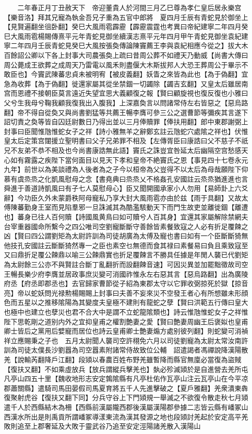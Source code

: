 　　二年春正月丁丑赦天下　帝迎董貴人於河間三月乙巳尊為孝仁皇后居永樂宫【樂音洛】拜其兄寵為執金吾兄子重為五官中郎將　夏四月壬辰有青蛇見於御坐上【見賢遍翻坐徂卧翻】癸巳大風雨雹霹靂【霹靂震霆也考異曰帝紀建寧二年四月癸巳大風雨雹楊賜傳熹平元年青蛇見御坐續漢志熹平元年四月甲午青蛇見御坐袁紀建寧二年四月壬辰青蛇見癸巳大風按張奐傳論陳竇薦王李與袁紀相應今從之】拔大木百餘詔公卿以下各上封事大司農張奐上疏曰昔周公葬不如禮天乃動威【尚書大傳曰周公薨成王欲葬之成周天乃雷電以風禾則盡偃大木斯拔邦人大恐王葬周公于畢示不敢臣也】今竇武陳蕃忠貞未被明宥【被皮義翻】妖眚之來皆為此也【為于偽翻】宜急為收葬【為于偽翻】徙還家屬其從坐禁錮一切蠲除【蠲吉玄翻】又皇太后雖居南宫而恩禮不接朝臣莫言遠近失望宜思大義顧復之報【賢曰顧旋視也復反復也小雅曰父兮生我母兮鞠我顧我復我出入腹我】上深嘉奐言以問諸常侍左右皆惡之【惡烏路翻】帝不得自從奐又與尚書劉猛等共薦王暢李膺可參三公之選曹節等彌疾其言遂下詔切責之奐等皆自囚廷尉數日乃得出並以三月俸贖罪【俸扶用翻】郎中東郡謝弼上封事曰臣聞惟虺惟蛇女子之祥【詩小雅無羊之辭鄭玄註云虺蛇穴處隂之祥也】伏惟皇太后定策宫闥援立聖明書曰父子兄弟罪不相及【左傳胥臣曰康誥曰父不慈子不祇兄不友弟不恭不相及也今尚書康誥無此語】竇氏之誅豈宜咎延太后幽隔空宫愁感天心如有霧露之疾陛下當何面目以見天下孝和皇帝不絶竇氏之恩【事見四十七卷永元九年】前世以為美談禮為人後者為之子今以桓帝為父豈得不以太后為母哉願陛下仰慕有虞烝烝之化凱風慰母之念【書堯典曰烝烝乂不格姦孔安國註云烝烝猶進進也言舜進于善道詩凱風曰有子七人莫慰母心】臣又聞開國承家小人勿用【易師卦上六爻辭】今功臣久外未蒙爵秩阿母寵私乃享大封大風雨雹亦由於兹【雨于具翻】又故太傅陳蕃勤身王室而見陷羣邪一旦誅滅其為酷濫駭動天下而門生故吏並離徙錮【離遭也】蕃身已往人百何贖【詩國風黄鳥曰如可贖兮人百其身】宜還其家屬解除禁網夫台宰重器國命所繫今之四公唯司空劉寵斷斷守善餘皆素餐致寇之人必有折足覆餗之凶【賢曰四公謂劉矩為太尉許訓為司徒胡廣為太傅及寵也書曰如有一个臣斷斷猗無他技孔安國註云斷斷猗然專一之臣也素空乜無德而食其禄曰素餐易曰負且乘致寇至又曰鼎折足覆公餗鼎以喻三公餗鼎實也折足覆餗言不勝具任據是年閒人襲已代劉矩為太尉餘三公亦不與賢註合斷丁亂翻折而設翻餗音速】可因災異並加罷黜徵故司空王暢長樂少府李膺並居政事庶災變可消國祚惟永左右惡其言【惡烏路翻】出為廣陵府丞【府丞即郡丞也】去官歸家曹節從子紹為東郡太守以它罪收弼掠死於獄【掠音亮】帝以蛇妖問光禄勲楊賜賜上封事曰夫善不妄來災不空發王者心有所想雖未形顔色而五星以之推移隂陽為其變度夫皇極不建則有龍蛇之孽【賢曰洪範五行傳曰皇大也極中也建立也孽災也君不合大中是謂不立蛇龍隂類也】詩云惟虺惟蛇女子之祥惟陛下思乾剛之道别内外之宜抑皇甫之權割艶妻之愛【賢曰艶妻周幽王后褒姒也皇甫卿士皆后之黨用后嬖寵而居位也詩云皇甫卿士艶妻煽方處别彼列翻】則蛇變可消禎祥立應賜秉之子也　五月太尉聞人襲司空許栩免六月以司徒劉寵為太尉太常汝南許訓為司徒太僕長沙劉囂為司空囂素附諸常侍故致位公輔　詔遣謁者馮禪說降漢陽散羌【說輸芮翻降戶江翻】段熲以春農百姓布野羌雖暫降而縣官無廩必當復為盜賊【復扶又翻】不如乘虛放兵【放兵謂縱兵擊羌也】埶必殄滅熲於是自進營去羌所屯凡亭山四五十里【魏收地形志安定鶉隂縣有凡亭杜佑作瓦亭山注云瓦亭山在今平凉郡蕭關縣】遣騎司馬田晏假司馬夏育將五千人先進擊破之【夏戶雅翻】羌衆潰東犇復聚射虎谷【復扶又翻下同】分兵守谷上下門熲規一舉滅之不欲復令散走秋七月熲遣千人於西縣結木為柵【西縣前漢屬隴西郡後漢屬漢陽郡參據二志皆云縣有嶓冢山西漢水所出是則禹貢所謂嶓冢導漾東流為漢其發源之地也段熲討羌起於安定高平羌敗則追至上郡奢延及大敗于靈武谷乃追至安定涇陽諸羌散入漢陽山